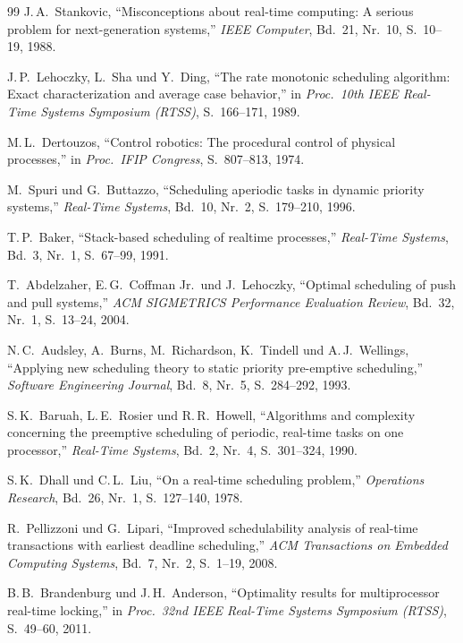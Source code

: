 ﻿\documentclass[a4paper,12pt]{article}
\theoremstyle{definition}
\begin{document}
\begin{thebibliography}{99}
		J.\,A.\ Stankovic,
		``Misconceptions about real-time computing: A serious problem for next-generation systems,''
		\textit{IEEE Computer}, Bd.~21, Nr.~10, S.~10--19, 1988.

		J.\,P.\ Lehoczky, L.\ Sha und Y.\ Ding,
		``The rate monotonic scheduling algorithm: Exact characterization and average case behavior,''
		in \textit{Proc.\ 10th IEEE Real-Time Systems Symposium (RTSS)}, S.~166--171, 1989.

		M.\,L.\ Dertouzos,
		``Control robotics: The procedural control of physical processes,''
		in \textit{Proc.\ IFIP Congress}, S.~807--813, 1974.

		M.\ Spuri und G.\ Buttazzo,
		``Scheduling aperiodic tasks in dynamic priority systems,''
		\textit{Real-Time Systems}, Bd.~10, Nr.~2, S.~179--210, 1996.

		T.\,P.\ Baker,
		``Stack-based scheduling of realtime processes,''
		\textit{Real-Time Systems}, Bd.~3, Nr.~1, S.~67--99, 1991.

		T.\ Abdelzaher, E.\,G.\ Coffman Jr.\ und J.\ Lehoczky,
		``Optimal scheduling of push and pull systems,''
		\textit{ACM SIGMETRICS Performance Evaluation Review}, Bd.~32, Nr.~1, S.~13--24, 2004.

		N.\,C.\ Audsley, A.\ Burns, M.\ Richardson, K.\ Tindell und A.\,J.\ Wellings,
		``Applying new scheduling theory to static priority pre-emptive scheduling,''
		\textit{Software Engineering Journal}, Bd.~8, Nr.~5, S.~284--292, 1993.

		S.\,K.\ Baruah, L.\,E.\ Rosier und R.\,R.\ Howell,
		``Algorithms and complexity concerning the preemptive scheduling of periodic,
		real-time tasks on one processor,''
		\textit{Real-Time Systems}, Bd.~2, Nr.~4, S.~301--324, 1990.

		S.\,K.\ Dhall und C.\,L.\ Liu,
		``On a real-time scheduling problem,''
		\textit{Operations Research}, Bd.~26, Nr.~1, S.~127--140, 1978.

		R.\ Pellizzoni und G.\ Lipari,
		``Improved schedulability analysis of real-time transactions with earliest deadline scheduling,''
		\textit{ACM Transactions on Embedded Computing Systems}, Bd.~7, Nr.~2, S.~1--19, 2008.

		B.\,B.\ Brandenburg und J.\,H.\ Anderson,
		``Optimality results for multiprocessor real-time locking,''
		in \textit{Proc.\ 32nd IEEE Real-Time Systems Symposium (RTSS)}, S.~49--60, 2011.


\end{thebibliography}
\end{document}
